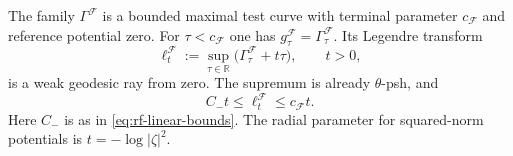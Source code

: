 \noindent\begin{minipage}{\linewidth}
\begin{theorem}\label{thm:rf-filtration-test-curve}
The family $\Gamma^{\mathcal F}$ is a bounded maximal test curve with terminal parameter $c_{\mathcal F}$ and reference potential zero. For $\tau<c_{\mathcal F}$ one has $g_\tau^{\mathcal F}=\Gamma_\tau^{\mathcal F}$. Its Legendre transform
\[
 \ell_t^{\mathcal F}:=\sup_{\tau\in\mathbb R}
             \bigl(\Gamma_\tau^{\mathcal F}+t\tau\bigr),\qquad t>0,
\tag{65.16}\label{eq:rf-filtration-ray}
\]
is a weak geodesic ray from zero. The supremum is already $\theta$-psh, and
\[
              C_-t\leq\ell_t^{\mathcal F}\leq c_{\mathcal F}t.
\]
Here $C_-$ is as in \eqref{eq:rf-linear-bounds}. The radial parameter for squared-norm potentials is $t=-\log|\zeta|^2$.
\end{theorem}
\end{minipage}\par

